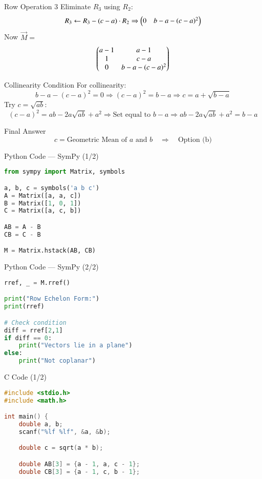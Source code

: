 \documentclass{beamer}
\begin{document}
\begin{frame}{Row Operation 3}
Eliminate \( R_3 \) using \( R_2 \):
\[
R_3 \leftarrow R_3 - (c - a) \cdot R_2
\Rightarrow \begin{pmatrix}0 & b - a - (c - a)^2\end{pmatrix}
\]
Now \( \vec{M} = \)
\[
\begin{pmatrix}
a - 1 & a - 1 \\
1     & c - a \\
0     & b - a - (c - a)^2
\end{pmatrix}
\]
\end{frame}

\begin{frame}{Collinearity Condition}
For collinearity:
\[
b - a - (c - a)^2 = 0
\Rightarrow (c - a)^2 = b - a
\Rightarrow c = a + \sqrt{b - a}
\]
Try \( c = \sqrt{ab} \):
\[
(c - a)^2 = ab - 2a\sqrt{ab} + a^2
\Rightarrow \text{Set equal to } b - a
\Rightarrow ab - 2a\sqrt{ab} + a^2 = b - a
\]
\end{frame}

\begin{frame}{Final Answer}
\[
\boxed{
c = \text{Geometric Mean of } a \text{ and } b
}
\quad \Rightarrow \quad \boxed{\text{Option (b)}}
\]
\end{frame}


\begin{frame}[fragile]{Python Code — SymPy (1/2)}
\begin{lstlisting}[language=Python]
from sympy import Matrix, symbols

a, b, c = symbols('a b c')
A = Matrix([a, a, c])
B = Matrix([1, 0, 1])
C = Matrix([a, c, b])

AB = A - B
CB = C - B

M = Matrix.hstack(AB, CB)
\end{lstlisting}
\end{frame}


\begin{frame}[fragile]{Python Code — SymPy (2/2)}
\begin{lstlisting}[language=Python]
rref, _ = M.rref()

print("Row Echelon Form:")
print(rref)

# Check condition
diff = rref[2,1]
if diff == 0:
    print("Vectors lie in a plane")
else:
    print("Not coplanar")
\end{lstlisting}
\end{frame}


\begin{frame}[fragile]{C Code (1/2)}
\begin{lstlisting}[language=C]
#include <stdio.h>
#include <math.h>

int main() {
    double a, b;
    scanf("%lf %lf", &a, &b);

    double c = sqrt(a * b);

    double AB[3] = {a - 1, a, c - 1};
    double CB[3] = {a - 1, c, b - 1};
\end{lstlisting}
\end{frame}
\end{document}
